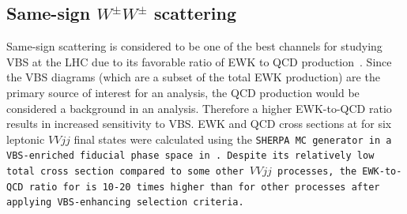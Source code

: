 \subsection{Same-sign $W^{\pm}W^{\pm}$ scattering}\label{ssww13tev:ssww_topology}
Same-sign \ssww scattering is considered to be one of the best channels for studying VBS at the LHC due to its favorable ratio of EWK to QCD production~\cite{2015.higgs-constraints-from-vbs}.
Since the VBS diagrams (which are a subset of the total EWK production) are the primary source of interest for an analysis, the QCD production would be considered a background in an analysis.
Therefore a higher EWK-to-QCD ratio results in increased sensitivity to VBS.
EWK and QCD cross sections at  for six leptonic $VVjj$ final states were calculated using the \tt{SHERPA} MC generator in a VBS-enriched fiducial phase space in~\cite{2014.ssww-thesis-gumpert}.
Despite its relatively low total cross section compared to some other $VVjj$ processes, the EWK-to-QCD ratio for \ssww is 10-20 times higher than for other processes after applying VBS-enhancing selection criteria.



